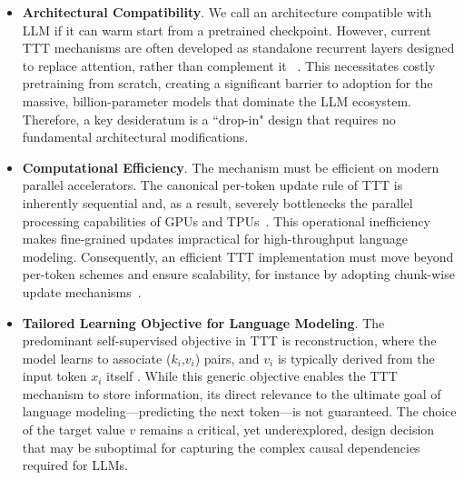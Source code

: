 \begin{itemize}
    \item \textbf{Architectural Compatibility}. We call an architecture compatible with LLM if it can warm start from a pretrained checkpoint.
    However, current TTT mechanisms are often developed as standalone recurrent layers designed to replace attention, rather than complement it ~\citep{sun2020ttt,wang2021tent,zhang2025tttdr,sun2024tttLayers,hu2025ttl}. This necessitates costly pretraining from scratch, creating a significant barrier to adoption for the massive, billion-parameter models that dominate the LLM ecosystem. Therefore, a key desideratum is a ``drop-in" design that requires no fundamental architectural modifications.
    
    \item \textbf{Computational Efficiency}. The mechanism must be efficient on modern parallel accelerators. The canonical per-token update rule of TTT is inherently sequential and, as a result, severely bottlenecks the parallel processing capabilities of GPUs and TPUs~\citep{ sun2020ttt,sun2024tttLayers,behrouz2024titans}. This operational inefficiency makes fine-grained updates impractical for high-throughput language modeling. Consequently, an efficient TTT implementation must move beyond per-token schemes and ensure scalability, for instance by adopting chunk-wise update mechanisms~\citep{li2025tnt,sun2023retentive,behrouz2024titans,irie2025fastweightprogramminglinear}.
    
    \item \textbf{Tailored Learning Objective for Language Modeling}. The predominant self-supervised objective in TTT is reconstruction, where the model learns to associate ($k_i$,$v_i$) pairs, and $v_i$ is typically derived from the input token $x_i$ itself \citep{sun2020ttt, sun2024tttLayers, zhang2025tttdr,wang2021tent,hu2025ttl}. While this generic objective enables the TTT mechanism to store information, its direct relevance to the ultimate goal of language modeling—predicting the next token—is not guaranteed. The choice of the target value $v$ remains a critical, yet underexplored, design decision that may be suboptimal for capturing the complex causal dependencies required for LLMs.
\end{itemize}
